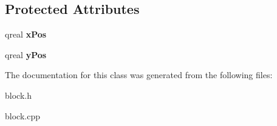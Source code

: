 \subsection*{Protected Attributes}
\begin{DoxyCompactItemize}
\item 
\hypertarget{class_block_a97b5b28230920e5f6e3335a023628477}{qreal {\bfseries x\-Pos}}\label{class_block_a97b5b28230920e5f6e3335a023628477}

\item 
\hypertarget{class_block_a0857435a94babc54051428becff56867}{qreal {\bfseries y\-Pos}}\label{class_block_a0857435a94babc54051428becff56867}

\end{DoxyCompactItemize}


The documentation for this class was generated from the following files\-:\begin{DoxyCompactItemize}
\item 
block.\-h\item 
block.\-cpp\end{DoxyCompactItemize}
